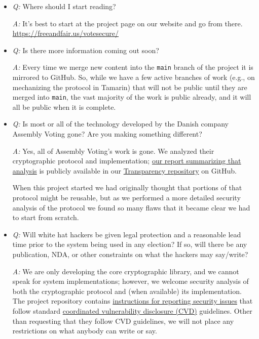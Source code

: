 \documentclass[12pt,letter]{article}
\begin{document}
\begin{itemize}

    \item \emph{Q:} Where should I start reading?

    \emph{A:} It's best to start at the project page on our website and go from there. \\
    \href{https://freeandfair.us/votesecure/}{https://freeandfair.us/votesecure/}

    \item \emph{Q:} Is there more information coming out soon?

    \emph{A:} Every time we merge new content into the \texttt{main} branch of the project it is mirrored to GitHub.  So, while we have a few active branches of work (e.g., on mechanizing the protocol in Tamarin) that will not be public until they are merged into \texttt{main}, the vast majority of the work is public already, and it will all be public when it is complete.

    \item \emph{Q:} Is most or all of the technology developed by the Danish company Assembly Voting gone? Are you making something different?

    \emph{A:} Yes, all of Assembly Voting's work is gone.  We analyzed their cryptographic protocol and implementation; \href{https://github.com/FreeAndFair/Transparency/blob/master/Project_Artifacts/Tusk_2024_Review/cryptographic-protocol-review-and-gap-analysis.pdf}{our report summarizing that analysis} is publicly available in our \href{https://github.com/FreeAndFair/Transparency}{Transparency repository} on GitHub.

    When this project started we had originally thought that portions of that protocol might be reusable, but as we performed a more detailed security analysis of the protocol we found so many flaws that it became clear we had to start from scratch.

    \item \emph{Q:} Will white hat hackers be given legal protection and a reasonable lead time prior to the system being used in any election?  If so, will there be any publication, NDA, or other constraints on what the hackers may say/write?

    \emph{A:} We are only developing the core cryptographic library, and we cannot speak for system implementations; however, we welcome security analysis of both the cryptographic protocol and (when available) its implementation. The project repository contains \href{https://github.com/FreeAndFair/VoteSecure/blob/main/SECURITY.md}{instructions for reporting security issues} that follow standard \href{https://en.wikipedia.org/wiki/Coordinated_vulnerability_disclosure}{coordinated vulnerability disclosure (CVD)} guidelines. Other than requesting that they follow CVD guidelines, we will not place any restrictions on what anybody can write or say.

\end{itemize}
\end{document}
